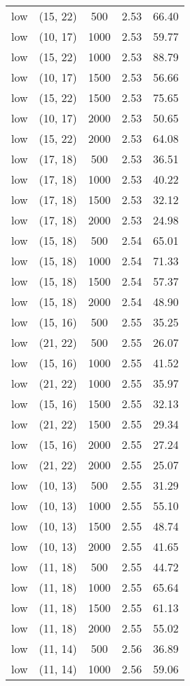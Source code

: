\begin{tabular}{c c c c c}
low & (15, 22) &  500 & 2.53 & 66.40 \\
low & (10, 17) &  1000 & 2.53 & 59.77 \\
low & (15, 22) &  1000 & 2.53 & 88.79 \\
low & (10, 17) &  1500 & 2.53 & 56.66 \\
low & (15, 22) &  1500 & 2.53 & 75.65 \\
low & (10, 17) &  2000 & 2.53 & 50.65 \\
low & (15, 22) &  2000 & 2.53 & 64.08 \\
low & (17, 18) &  500 & 2.53 & 36.51 \\
low & (17, 18) &  1000 & 2.53 & 40.22 \\
low & (17, 18) &  1500 & 2.53 & 32.12 \\
low & (17, 18) &  2000 & 2.53 & 24.98 \\
low & (15, 18) &  500 & 2.54 & 65.01 \\
low & (15, 18) &  1000 & 2.54 & 71.33 \\
low & (15, 18) &  1500 & 2.54 & 57.37 \\
low & (15, 18) &  2000 & 2.54 & 48.90 \\
low & (15, 16) &  500 & 2.55 & 35.25 \\
low & (21, 22) &  500 & 2.55 & 26.07 \\
low & (15, 16) &  1000 & 2.55 & 41.52 \\
low & (21, 22) &  1000 & 2.55 & 35.97 \\
low & (15, 16) &  1500 & 2.55 & 32.13 \\
low & (21, 22) &  1500 & 2.55 & 29.34 \\
low & (15, 16) &  2000 & 2.55 & 27.24 \\
low & (21, 22) &  2000 & 2.55 & 25.07 \\
low & (10, 13) &  500 & 2.55 & 31.29 \\
low & (10, 13) &  1000 & 2.55 & 55.10 \\
low & (10, 13) &  1500 & 2.55 & 48.74 \\
low & (10, 13) &  2000 & 2.55 & 41.65 \\
low & (11, 18) &  500 & 2.55 & 44.72 \\
low & (11, 18) &  1000 & 2.55 & 65.64 \\
low & (11, 18) &  1500 & 2.55 & 61.13 \\
low & (11, 18) &  2000 & 2.55 & 55.02 \\
low & (11, 14) &  500 & 2.56 & 36.89 \\
low & (11, 14) &  1000 & 2.56 & 59.06 \\

\end{tabular}
